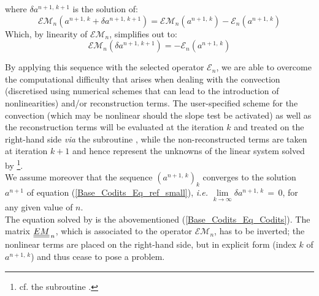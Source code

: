 where $\delta a^{n+1,\,k+1}$ is the solution of:
\begin{equation}
\mathcal{EM}_{n}(a^{n+1,\,k} + \delta a^{n+1,\,k+1}) = \mathcal{EM}_{n}(a^{n+1,\,k}) - \mathcal{E}_{n}(a^{n+1,\,k})
\end{equation}
Which, by linearity of $\mathcal{EM}_{n}$, simplifies out to:
\begin{equation}
\mathcal{EM}_{n}(\delta a^{n+1,\,k+1}) = - \mathcal{E}_{n}(a^{n+1,\,k})
\label{Base_Codits_Eq_Codits}
\end{equation}

By applying this sequence with the selected operator $\mathcal{E}_{n}$, we
are able to overcome the computational difficulty that arises when dealing
with the convection (discretised using numerical schemes that can lead to the
introduction of nonlinearities) and/or reconstruction terms. The user-specified scheme for the
convection (which may be nonlinear should the slope test be activated) as
well as the reconstruction terms will be evaluated at the iteration $k$ and treated on the right-hand side {\it via} the subroutine , while the non-reconstructed terms are taken at iteration $k+1$ and hence represent the unknowns
of the linear system solved by \footnote{cf. the subroutine
.}.\\

We assume moreover that the sequence $(a^{n+1,\,k})_k$ converges to the solution
$a^{n+1}$ of equation (\ref{Base_Codits_Eq_ref_small}), {\it i.e.}
$\lim\limits_{k\rightarrow\infty} \delta a^{n+1,\,k}\,=\,0$, for any given value of $n$.\\
The equation solved by  is the abovementioned (\ref{Base_Codits_Eq_Codits}). The
matrix $\underline{\underline{EM}}_{\,n}$, which is associated to the operator $\mathcal{EM}_{n}$, has to be
inverted; the nonlinear terms are placed on the right-hand side, but in explicit form
(index $k$ of $a^{n+1,\,k}$) and thus cease to pose a problem.

